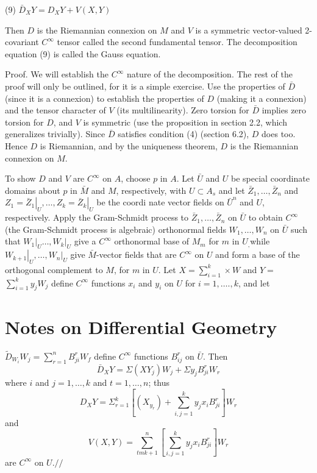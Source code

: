 \documentclass[10pt]{article}
\begin{document}
(9) $\bar{D}_{X} Y=D_{X} Y+V(X, Y)$

Then $D$ is the Riemannian connexion on $M$ and $V$ is a symmetric vector-valued 2-covariant $C^{\infty}$ tensor called the second fundamental tensor. The decomposition equation (9) is called the Gauss equation.

Proof. We will establish the $C^{\infty}$ nature of the decomposition. The rest of the proof will only be outlined, for it is a simple exercise. Use the properties of $\bar{D}$ (since it is a connexion) to establish the properties of $D$ (making it a connexion) and the tensor character of $V$ (its multilinearity). Zero torsion for $\bar{D}$ implies zero torsion for $D$, and $V$ is symmetric (use the proposition in section 2.2, which generalizes trivially). Since $\bar{D}$ satisfies condition (4) (section 6.2), $D$ does too. Hence $D$ is Riemannian, and by the uniqueness theorem, $D$ is the Riemannian connexion on $M .$

To show $D$ and $V$ are $C^{\infty}$ on $A$, choose $p$ in $A$. Let $\bar{U}$ and $U$ be special coordinate domains about $p$ in $\bar{M}$ and $M$, respectively, with $U \subset A_{s}$ and let $\bar{Z}_{1}, \ldots, \bar{Z}_{n}$ and $Z_{1}=\left.\bar{Z}_{1}\right|_{U}, \ldots, Z_{k}=\left.\bar{Z}_{k}\right|_{U}$ be the coordi nate vector fields on $\bar{U}^{n}$ and $U$, respectively. Apply the Gram-Schmidt process to $\bar{Z}_{1}, \ldots, \bar{Z}_{n}$ on $\bar{U}$ to obtain $C^{\infty}$ (the Gram-Schmidt process is algebraic) orthonormal fields $W_{1}, \ldots, W_{n}$ on $\bar{U}$ such that $\left.W_{1}\right|_{U} \ldots,\left.W_{k}\right|_{U}$ give a $C^{\infty}$ orthonormal base of $M_{m}$ for $m$ in $U_{,}$while $\left.W_{k+1}\right|_{U}, \ldots,\left.W_{n}\right|_{U}$ give $\bar{M}$-vector fields that are $C^{\infty}$ on $U$ and form a base of the orthogonal complement to $M$, for $m$ in $U$. Let $X=\sum_{i=1}^{k} \times W$ and $Y=$ $\sum_{i=1}^{k} y_{j} W_{j}$ define $C^{\infty}$ functions $x_{i}$ and $y_{i}$ on $U$ for $i=1, \ldots ., k$, and let

\section{Notes on Differential Geometry}
$\widetilde{D}_{W_{i}} W_{j}=\sum_{r=1}^{n} B_{j i}^{r} W_{f}$ define $C^{\infty}$ functions $B_{i j}^{r}$ on $\bar{U}$. Then
$$
\bar{D}_{X} Y=\Sigma\left(X Y_{j}\right) W_{j}+\Sigma y_{j} B_{j i}^{r} W_{r}
$$
where $i$ and $j=1, \ldots, k$ and $t=1, \ldots, n$; thus
$$
D_{X} Y=\Sigma_{r=1}^{k}\left[\left(X_{y_{r}}\right)+\sum_{i, j=1}^{k} y_{j} x_{i} B_{j i}^{r}\right] W_{r}
$$
and
$$
V(X, Y)=\sum_{t m k+1}^{n}\left[\sum_{i, j=1}^{k} y_{j} x_{i} B_{j i}^{r}\right] W_{r}
$$
are $C^{\infty}$ on $U . / /$
\end{document}

